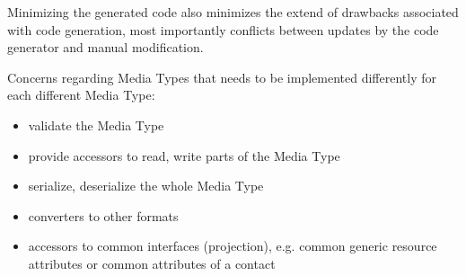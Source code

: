 \documentclass[12pt,a4paper]{scrartcl}		%
\begin{document}
Minimizing the generated code also minimizes the extend of drawbacks associated
with code generation, most importantly conflicts between updates by the code
generator and manual modification.




Concerns regarding Media Types that needs to be implemented differently for each different Media Type:
\begin{itemize}
\item validate the Media Type
\item provide accessors to read, write parts of the Media Type
\item serialize, deserialize the whole Media Type
\item converters to other formats
\item accessors to common interfaces (projection), e.g. common generic resource attributes or common attributes of a contact
\end{itemize}
\end{document}
